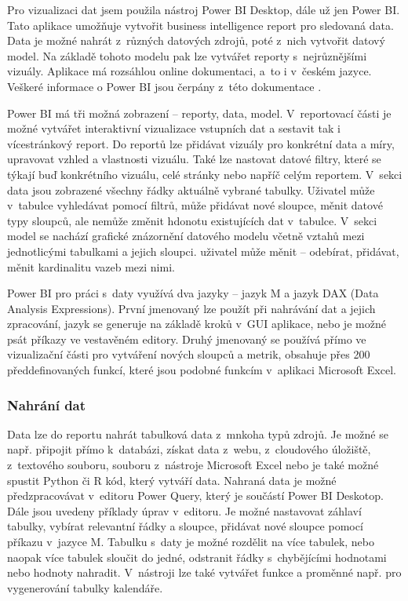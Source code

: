 Pro vizualizaci dat jsem použila nástroj Power BI Desktop, dále už jen Power BI. Tato aplikace umožňuje vytvořit business intelligence report pro sledovaná data. Data je možné nahrát z~různých datových zdrojů, poté z~nich vytvořit datový model. Na základě tohoto modelu pak lze vytvářet reporty s~nejrůznějšími vizuály. Aplikace má rozsáhlou online dokumentaci, a~to i v~českém jazyce. Veškeré informace o Power BI jsou čerpány z~této dokumentace \cite{bib:PBI}. 

Power BI má tři možná zobrazení -- reporty, data, model. V~reportovací části je možné vytvářet interaktivní vizualizace vstupních dat a sestavit tak i vícestránkový report. Do reportů lze přidávat vizuály pro konkrétní data a míry, upravovat vzhled a vlastnosti vizuálu. Také lze nastovat datové filtry, které se týkají buď konkrétního vizuálu, celé stránky nebo napříč celým reportem. V~sekci data jsou zobrazené všechny řádky aktuálně vybrané tabulky. Uživatel může v~tabulce vyhledávat pomocí filtrů, může přidávat nové sloupce, měnit datové typy sloupců, ale nemůže změnit hdonotu existujících dat v~tabulce. V~sekci model se nachází grafické znázornění datového modelu včetně vztahů mezi jednotlicými tabulkami a jejich sloupci. uživatel může měnit -- odebírat, přidávat, měnit kardinalitu vazeb mezi nimi.

Power BI pro práci s~daty využívá dva jazyky -- jazyk M a jazyk DAX (Data Analysis Expressions). První jmenovaný lze použít při nahrávání dat a jejich zpracování, jazyk se generuje na základě kroků v~GUI aplikace, nebo je možné psát příkazy ve vestavěném editory. Druhý jmenovaný se používá přímo ve vizualizační části pro vytváření nových sloupců a metrik, obsahuje přes 200 předdefinovaných funkcí, které jsou podobné funkcím v~aplikaci Microsoft Excel.

\subsubsection*{Nahrání dat}

Data lze do reportu nahrát tabulková data z~mnkoha typů zdrojů. Je možné se např. připojit přímo k~databázi, získat data z~webu, z~cloudového úložiště, z~textového souboru, souboru z~nástroje Microsoft Excel nebo je také možné spustit Python či R kód, který vytváří data. Nahraná data je možné předzpracovávat v~editoru Power Query, který je součástí Power BI Deskotop. Dále jsou uvedeny příklady úprav v~editoru. Je možné nastavovat záhlaví tabulky, vybírat relevantní řádky a sloupce, přidávat nové sloupce pomocí příkazu v~jazyce M. Tabulku s~daty je možné rozdělit na více tabulek, nebo naopak více tabulek sloučit do jedné, odstranit řádky s~chybějícími hodnotami nebo hodnoty nahradit. V~nástroji lze také vytvářet funkce a proměnné např. pro vygenerování tabulky kalendáře.


